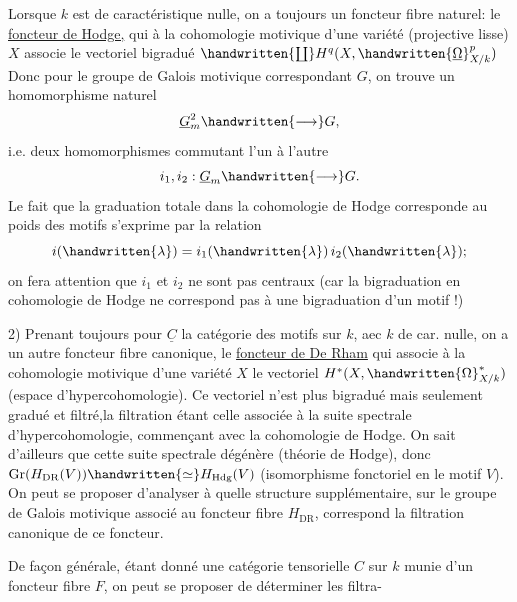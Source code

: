 
Lorsque $k$ est de caractéristique nulle, on a toujours un foncteur fibre naturel: le \uline{foncteur de Hodge,} qui à la cohomologie motivique d'une variété (projective lisse) $X$ associe le vectoriel bigradué $\handwritten{\coprod}H^q(X,\handwritten{\underline{\Omega}}^p_{X/k})$ Donc pour le groupe de Galois motivique correspondant $G$, on trouve un homomorphisme naturel\quad{}
\[
\underline{G}_m^2\handwritten{\longrightarrow}G,
\]
i.e. deux homomorphismes commutant l'un à l'autre\hspace{1em}
\[
i_1,i_2:\underline{G}_m\handwritten{\longrightarrow}G.
\]
Le fait que la graduation totale dans la cohomologie de Hodge corresponde au poids des motifs s'exprime par la relation
\[
i(\handwritten{\lambda})=i_1(\handwritten{\lambda})\,i_2(\handwritten{\lambda});
\]
on fera attention que $i_1$ et $i_2$ ne sont pas centraux (car la bigraduation en cohomologie de Hodge ne correspond pas à une bigraduation d'un motif !)

2) Prenant toujours pour $\underline{C}$ la catégorie des motifs sur $k$, aec $k$ de car. nulle, on a un autre foncteur fibre canonique, le \uline{foncteur de De Rham} qui associe à la cohomologie motivique d'une variété $X$ le vectoriel $H^*(X,\handwritten{\Omega}^*_{X/k})$ (espace d'hypercohomologie). Ce vectoriel n'est plus bigradué mais seulement gradué et filtré,\handwritten{(}la filtration étant celle associée à la suite spectrale d'hypercohomologie, commençant avec la cohomologie de Hodge\handwritten{)}. On sait d'ailleurs que cette suite spectrale dégénère (théorie de Hodge), donc $\operatorname{Gr}(H_{\mathrm{DR}}(V))\handwritten{\simeq}H_{\mathrm{Hdg}}(V)$ (isomorphisme fonctoriel en le motif $V$). On peut se proposer d'analyser à quelle structure supplémentaire, sur le groupe de Galois motivique associé au foncteur fibre $H_{\mathrm{DR}}$, correspond la filtration canonique de ce foncteur.


De façon générale, étant donné une catégorie tensorielle $C$ sur $k$ munie d'un foncteur fibre $F$, on peut se proposer de déterminer les filtra-

